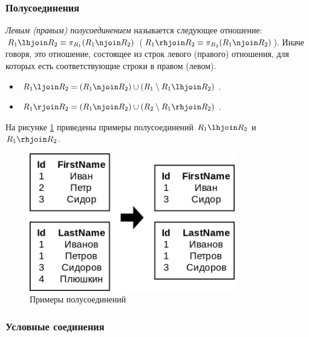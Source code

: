 \subsubsection{Полусоединения}

\begin{definition}
	\textit{Левым (правым) полусоединением} называется следующее отношение: $R_1 \lhjoin R_2 \equiv \pi_{R_1}(R_1 \njoin R_2)$
	($R_1 \rhjoin R_2 \equiv \pi_{R_2}(R_1 \njoin R_2)$). Иначе говоря, это отношение, состоящее из
	строк левого (правого) отношения, для которых есть соответствующие строки в правом (левом).
\end{definition}

\begin{remark}
	\enewline
	\begin{itemize}
		\item $R_1 \ljoin R_2 = (R_1 \njoin R_2) \cup (R_1 \setminus R_1 \lhjoin R_2)$.
		\item $R_1 \rjoin R_2 = (R_1 \njoin R_2) \cup (R_2 \setminus R_1 \rhjoin R_2)$.
	\end{itemize}
\end{remark}

На рисунке \ref{lrh-join-ex} приведены примеры полусоединений $R_1 \lhjoin R_2$ и
$R_1 \rhjoin R_2$.

\begin{figure}[H]
	\centering
	\includegraphics[width=0.8\textwidth]{../assets/kgeorgiy/relalgebra/Join_Semi_2.svg.png}
	\caption{Примеры полусоединений}
	\label{lrh-join-ex}
\end{figure}

\subsubsection{Условные соединения}

